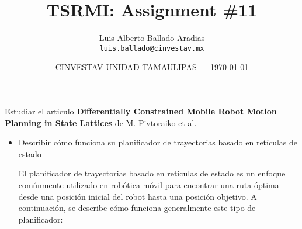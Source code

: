 \documentclass{article}
\title{TSRMI: Assignment \#11} %
\author{Luis Alberto Ballado Aradias\\ \texttt{luis.ballado@cinvestav.mx}} %
\date{CINVESTAV UNIDAD TAMAULIPAS --- \today} %
\begin{document}
\maketitle %


Estudiar el articulo \textbf{Differentially Constrained Mobile Robot Motion Planning in State Lattices} de M. Pivtoraiko et al.\\

\begin{itemize}
\item Describir cómo funciona su planificador de trayectorias basado en retículas de estado

  El planificador de trayectorias basado en retículas de estado es un enfoque comúnmente utilizado en robótica móvil para encontrar una ruta óptima desde una posición inicial del robot hasta una posición objetivo. A continuación, se describe cómo funciona generalmente este tipo de planificador:


\end{itemize}
\end{document}
